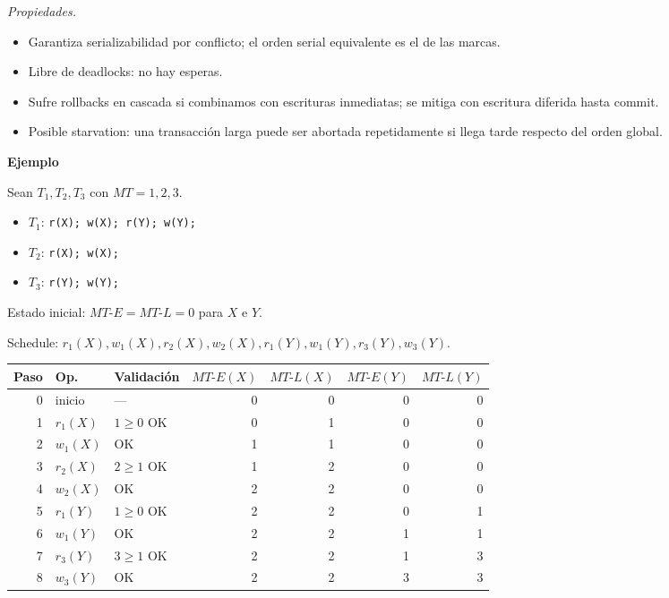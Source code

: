 \documentclass[11pt,a4paper]{article}
\newcommand{\itemcabecera}[1]{\noindent\textbf{#1}\par\medskip}
\newcommand{\bloqueEjemplo}{\itemcabecera{Ejemplo}}
\begin{document}
\textit{Propiedades.}

\begin{itemize}
    \item Garantiza serializabilidad por conflicto; el orden serial equivalente es el de las marcas.
    \item Libre de deadlocks: no hay esperas.
    \item Sufre rollbacks en cascada si combinamos con escrituras inmediatas; se mitiga con escritura diferida hasta commit.
    \item Posible starvation: una transacción larga puede ser abortada repetidamente si llega tarde respecto del orden global.
\end{itemize}

\bloqueEjemplo

Sean $T_1, T_2, T_3$ con $MT = 1, 2, 3$.

\begin{itemize}
    \item $T_1$: \texttt{r(X); w(X); r(Y); w(Y);}
    \item $T_2$: \texttt{r(X); w(X);}
    \item $T_3$: \texttt{r(Y); w(Y);}
\end{itemize}

Estado inicial: $MT\text{-}E = MT\text{-}L = 0$ para $X$ e $Y$.

Schedule: $r_1(X), w_1(X), r_2(X), w_2(X), r_1(Y), w_1(Y), r_3(Y), w_3(Y)$.

\begin{center}
\small
\begin{tabular}{r l l rrrr}
\toprule
Paso & Op. & Validación & $MT\text{-}E(X)$ & $MT\text{-}L(X)$ & $MT\text{-}E(Y)$ & $MT\text{-}L(Y)$ \\
\midrule
0 & inicio & --- & 0 & 0 & 0 & 0 \\
1 & $r_1(X)$ & $1 \ge 0$ OK & 0 & 1 & 0 & 0 \\
2 & $w_1(X)$ & OK & 1 & 1 & 0 & 0 \\
3 & $r_2(X)$ & $2 \ge 1$ OK & 1 & 2 & 0 & 0 \\
4 & $w_2(X)$ & OK & 2 & 2 & 0 & 0 \\
5 & $r_1(Y)$ & $1 \ge 0$ OK & 2 & 2 & 0 & 1 \\
6 & $w_1(Y)$ & OK & 2 & 2 & 1 & 1 \\
7 & $r_3(Y)$ & $3 \ge 1$ OK & 2 & 2 & 1 & 3 \\
8 & $w_3(Y)$ & OK & 2 & 2 & 3 & 3 \\
\bottomrule
\end{tabular}
\end{center}
\end{document}
